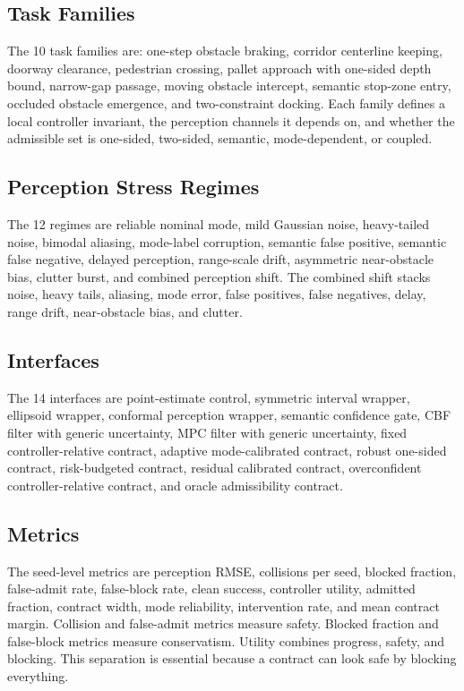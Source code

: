 \documentclass{article}
\begin{document}
\subsection{Task Families}

The 10 task families are: one-step obstacle braking, corridor centerline keeping, doorway clearance, pedestrian crossing, pallet approach with one-sided depth bound, narrow-gap passage, moving obstacle intercept, semantic stop-zone entry, occluded obstacle emergence, and two-constraint docking. Each family defines a local controller invariant, the perception channels it depends on, and whether the admissible set is one-sided, two-sided, semantic, mode-dependent, or coupled.

\subsection{Perception Stress Regimes}

The 12 regimes are reliable nominal mode, mild Gaussian noise, heavy-tailed noise, bimodal aliasing, mode-label corruption, semantic false positive, semantic false negative, delayed perception, range-scale drift, asymmetric near-obstacle bias, clutter burst, and combined perception shift. The combined shift stacks noise, heavy tails, aliasing, mode error, false positives, false negatives, delay, range drift, near-obstacle bias, and clutter.

\subsection{Interfaces}

The 14 interfaces are point-estimate control, symmetric interval wrapper, ellipsoid wrapper, conformal perception wrapper, semantic confidence gate, CBF filter with generic uncertainty, MPC filter with generic uncertainty, fixed controller-relative contract, adaptive mode-calibrated contract, robust one-sided contract, risk-budgeted contract, residual calibrated contract, overconfident controller-relative contract, and oracle admissibility contract.

\subsection{Metrics}

The seed-level metrics are perception RMSE, collisions per seed, blocked fraction, false-admit rate, false-block rate, clean success, controller utility, admitted fraction, contract width, mode reliability, intervention rate, and mean contract margin. Collision and false-admit metrics measure safety. Blocked fraction and false-block metrics measure conservatism. Utility combines progress, safety, and blocking. This separation is essential because a contract can look safe by blocking everything.
\end{document}

